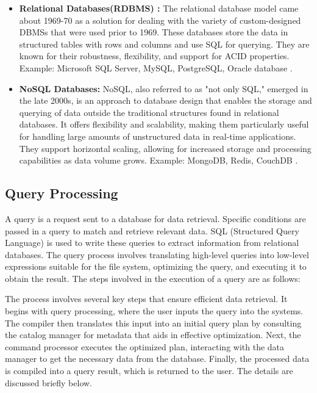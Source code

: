 \begin{itemize}
    \item \textbf{Relational Databases(RDBMS) :} The relational database model came about 1969-70 as a solution for dealing with the variety of custom-designed DBMSs that were used prior to 1969. These databases store the data in structured tables with rows and columns and use SQL for querying. They are known for their robustness, flexibility, and support for ACID properties. Example: Microsoft SQL Server, MySQL, PostgreSQL, Oracle database \cite{editor-2024,foote-2023}.
    
    \item \textbf{NoSQL Databases:} NoSQL, also referred to as "not only SQL," emerged in the late 2000s, is an approach to database design that enables the storage and querying of data outside the traditional structures found in relational databases. It offers flexibility and scalability, making them particularly useful for handling large amounts of unstructured data in real-time applications. They support horizontal scaling, allowing for increased storage and processing capabilities as data volume grows. Example: MongoDB, Redis, CouchDB \cite{ibm-2024,justacademy_nosql_characteristics}.
\end{itemize}

\subsection{Query Processing }
A query is a request sent to a database for data retrieval. Specific conditions are passed in a query to match and retrieve relevant data. SQL (Structured Query Language) is used to write these queries to extract information from relational databases. The query process involves translating high-level queries into low-level expressions suitable for the file system, optimizing the query, and executing it to obtain the result. The steps involved in the execution of a query are as follows: \cite{wwwnaukricom-no-date}

The process involves several key steps that ensure efficient data retrieval. It begins with query processing, where the user inputs the query into the systems. The compiler then translates this input into an initial query plan by consulting the catalog manager for metadata that aids in effective optimization. Next, the command processor executes the optimized plan, interacting with the data manager to get the necessary data from the database. Finally, the processed data is compiled into a query result, which is returned to the user. The details are discussed briefly below.

